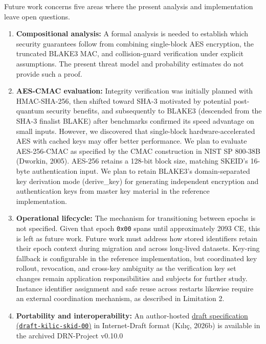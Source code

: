 \documentclass[fleqn,10pt]{wlpeerj}
\begin{document}
Future work concerns five areas where the present analysis and
implementation leave open questions.

\begin{enumerate}
\def\labelenumi{\arabic{enumi}.}
\item
  \textbf{Compositional analysis:} A formal analysis is needed to
  establish which security guarantees follow from combining single-block
  AES encryption, the truncated BLAKE3 MAC, and collision-guard
  verification under explicit assumptions. The present threat model and
  probability estimates do not provide such a proof.
\item
  \textbf{AES-CMAC evaluation:} Integrity verification was initially
  planned with HMAC-SHA-256, then shifted toward SHA-3 motivated by
  potential post-quantum security benefits, and subsequently to BLAKE3
  (descended from the SHA-3 finalist BLAKE) after benchmarks confirmed
  its speed advantage on small inputs. However, we discovered that
  single-block hardware-accelerated AES with cached keys may offer
  better performance. We plan to evaluate AES-256-CMAC as specified by
  the CMAC construction in NIST SP 800-38B (Dworkin, 2005). AES-256
  retains a 128-bit block size, matching SKEID's 16-byte authentication
  input. We plan to retain BLAKE3's domain-separated key derivation mode
  (derive\_key) for generating independent encryption and authentication
  keys from master key material in the reference implementation.
\item
  \textbf{Operational lifecycle:} The mechanism for transitioning
  between epochs is not specified. Given that epoch \texttt{0x00} spans
  until approximately 2093 CE, this is left as future work. Future work
  must address how stored identifiers retain their epoch context during
  migration and across long-lived datasets. Key-ring fallback is
  configurable in the reference implementation, but coordinated key
  rollout, revocation, and cross-key ambiguity as the verification key
  set changes remain application responsibilities and subjects for
  further study. Instance identifier assignment and safe reuse across
  restarts likewise require an external coordination mechanism, as
  described in Limitation 2.
\item
  \textbf{Portability and interoperability:} An author-hosted
  \href{https://github.com/duranserkan/DRN-Project/blob/release/v0.10.0/docs/draft-skid-00.md}{draft
  specification (\texttt{draft-kilic-skid-00})} in Internet-Draft format
  (Kılıç, 2026b) is available in the archived DRN-Project v0.10.0

\end{enumerate}
\end{document}
